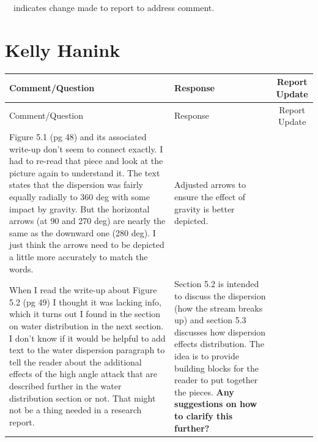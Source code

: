 \documentclass[12pt,oneside]{book}
\begin{document}
\begin{landscape}
\begin{longtable}{|L{4in}|L{3.75in}|c|}
		\hline
\end{longtable}
\checkmark~~indicates change made to report to address comment.

\newpage

\section{Kelly Hanink}
\begin{longtable}{|L{4in}|L{3.75in}|c|}

		\hline
		Comment/Question & Response & Report Update \\ 
		\toprule[1.0pt] \endfirsthead
		\hline
		Comment/Question & Response & Report Update \\ 
		\toprule[1.0pt] \endhead
		\hline

		\hline
		Figure 5.1 (pg 48) and its associated write-up don't seem to connect exactly. I had to re-read that piece and look at the picture again to understand it. The text states that the dispersion was fairly equally radially to 360 deg with some impact by gravity. But the horizontal arrows (at 90 and 270 deg) are nearly the same as the downward one (280 deg). I just think the arrows need to be depicted a little more accurately to match the words. & 
		Adjusted arrows to ensure the effect of gravity is better depicted. & \checkmark \\  

		\hline
		When I read the write-up about Figure 5.2 (pg 49) I thought it was lacking info, which it turns out I found in the section on water distribution in the next section. I don't know if it would be helpful to add text to the water dispersion paragraph to tell the reader about the additional effects of the high angle attack that are described further in the water distribution section or not. That might not be a thing needed in a research report. & 
		Section 5.2 is intended to discuss the dispersion (how the stream breaks up) and section 5.3 discusses how dispersion effects distribution. The idea is to provide building blocks for the reader to put together the pieces. \textbf{Any suggestions on how to clarify this further?} & \\


\end{longtable}
\end{landscape}
\end{document}
